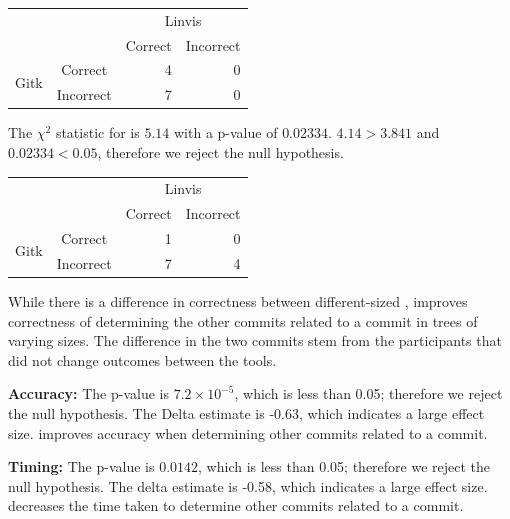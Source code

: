 \begin{itemize}
    \vspace{2mm}
    \begin{tabular}{cc|rr}
                             &           & \multicolumn{2}{c}{Linvis}\\
                             &           & Correct                      & Incorrect\\\hline
      \multirow{2}{*}{Gitk}  & Correct   & 4                            & 0\\
                             & Incorrect & 7                            & 0\\
    \end{tabular}
    \vspace{3mm}

    The $\chi^2$ statistic for \comB is $5.14$ with a p-value of
    $0.02334$. $4.14 > 3.841$ and $0.02334 < 0.05$, therefore we reject
    the null hypothesis.

    \vspace{2mm}
    \begin{tabular}{cc|rr}
                             &           & \multicolumn{2}{c}{Linvis}\\
                             &           & Correct                      & Incorrect\\\hline
      \multirow{2}{*}{Gitk}  & Correct   & 1                            & 0\\
                             & Incorrect & 7                            & 4\\
    \end{tabular}
    \vspace{3mm}

    While there is a difference in correctness between different-sized
    , \tool improves correctness of determining the other
    commits related to a commit in trees of varying sizes. The
    difference in the two commits stem from the participants that did
    not change outcomes between the tools.

    \textbf{Accuracy:}
    The p-value is $7.2 \times 10^{-5}$, which is less than 0.05;
    therefore we reject the null hypothesis. The Delta estimate is
    -0.63, which indicates a large effect size. \tool improves
    accuracy when determining other commits related to a commit.

    \textbf{Timing:}
    The p-value is $0.0142$, which is less than 0.05; therefore we
    reject the null hypothesis. The delta estimate is -0.58, which
    indicates a large effect size. \tool decreases the time taken to
    determine other commits related to a commit.


\end{itemize}
